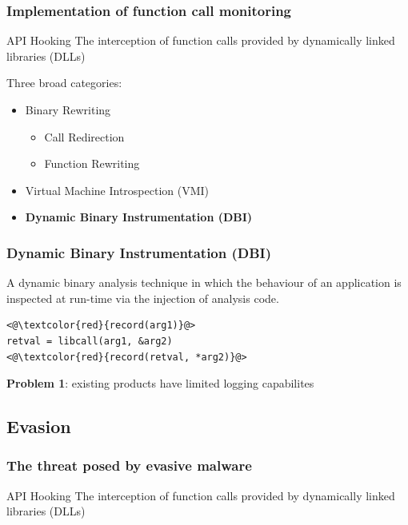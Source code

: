 \documentclass[compress]{beamer}
\begin{document}
\begin{frame}
    \frametitle{Implementation of function call monitoring}
	
	    \begin{beamerboxesrounded}[shadow=true]{API Hooking}
    The interception of function calls provided by dynamically
linked \\ libraries (DLLs)
    \end{beamerboxesrounded}
    \bigskip
	Three broad categories:    
    
    \begin{itemize}
    \item Binary Rewriting
    \begin{itemize}
    \item Call Redirection
    \item Function Rewriting
    \end{itemize}
    \item Virtual Machine Introspection (VMI)
    \item \textbf{Dynamic Binary Instrumentation (DBI)}
    \end{itemize}

\end{frame}

\begin{frame}[fragile]
    \frametitle{Dynamic Binary Instrumentation (DBI)}
	
A dynamic binary analysis
technique in which the behaviour of an application is inspected at run-time via the
injection of analysis code. 
\bigskip
\begin{block}{}
\begin{lstlisting}[basicstyle=\ttfamily\large,xleftmargin=50pt]
<@\textcolor{red}{record(arg1)}@> 
retval = libcall(arg1, &arg2)
<@\textcolor{red}{record(retval, *arg2)}@> 
\end{lstlisting}
\end{block}
\bigskip
\textbf{Problem 1}: existing products have limited logging capabilites

\end{frame}

\subsection{Evasion}

\begin{frame}
    \frametitle{The threat posed by evasive malware}
	
		    \begin{beamerboxesrounded}[shadow=true]{API Hooking}
    The interception of function calls provided by dynamically
linked \\ libraries (DLLs)
    \end{beamerboxesrounded}
    \bigskip

\end{frame}
\end{document}

